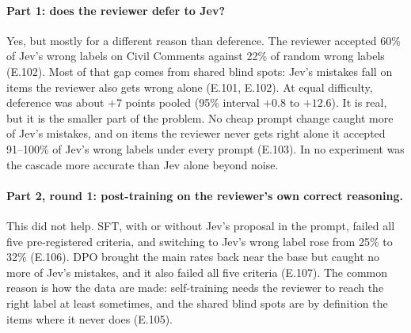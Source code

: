 \documentclass[11pt]{article}
\renewcommand{\_}{\origunderscore\allowbreak}
\begin{document}
\paragraph{Part 1: does the reviewer defer to Jev?} Yes, but mostly for a different reason than deference. The reviewer accepted 60\% of Jev's wrong labels on Civil Comments against 22\% of random wrong labels (E.102). Most of that gap comes from shared blind spots: Jev's mistakes fall on items the reviewer also gets wrong alone (E.101, E.102). At equal difficulty, deference was about $+7$ points pooled (95\% interval $+0.8$ to $+12.6$). It is real, but it is the smaller part of the problem. No cheap prompt change caught more of Jev's mistakes, and on items the reviewer never gets right alone it accepted 91--100\% of Jev's wrong labels under every prompt (E.103). In no experiment was the cascade more accurate than Jev alone beyond noise.

\paragraph{Part 2, round 1: post-training on the reviewer's own correct reasoning.} This did not help. SFT, with or without Jev's proposal in the prompt, failed all five pre-registered criteria, and switching to Jev's wrong label rose from 25\% to 32\% (E.106). DPO brought the main rates back near the base but caught no more of Jev's mistakes, and it also failed all five criteria (E.107). The common reason is how the data are made: self-training needs the reviewer to reach the right label at least sometimes, and the shared blind spots are by definition the items where it never does (E.105).
\end{document}

